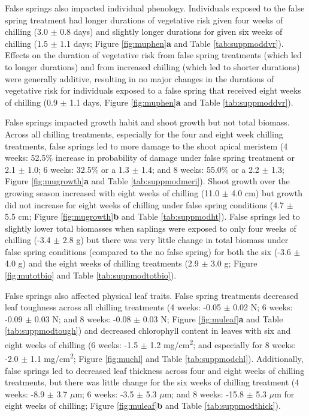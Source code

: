 \documentclass{article}\usepackage[]{graphicx}\usepackage[]{color}
\begin{document}
False springs also impacted individual phenology. Individuals exposed to the false spring treatment had longer durations of vegetative risk given four weeks of chilling (3.0 $\pm$ 0.8 days) and slightly longer durations for given six weeks of chilling (1.5 $\pm$ 1.1 days; Figure \ref{fig:muphen}\textbf{a} and Table \ref{tab:suppmoddvr}). Effects on the duration of vegetative risk from false spring treatments (which led to longer durations) and from increased chilling (which led to shorter durations) were generally additive, resulting in no major changes in the durations of vegetative risk for individuals exposed to a false spring that received eight weeks of chilling (0.9 $\pm$ 1.1 days, Figure \ref{fig:muphen}\textbf{a} and Table \ref{tab:suppmoddvr}). 

False springs impacted growth habit and shoot growth but not total biomass. Across all chilling treatments, especially for the four and eight week chilling treatments, false springs led to more damage to the shoot apical meristem (4 weeks: 52.5\% increase in probability of damage under false spring treatment or 2.1 $\pm$ 1.0; 6 weeks: 32.5\% or a 1.3 $\pm$ 1.4; and 8 weeks: 55.0\% or a 2.2 $\pm$ 1.3; Figure \ref{fig:mugrowth}\textbf{a} and Table \ref{tab:suppmodmeri}). Shoot growth over the growing season increased with eight weeks of chilling (11.0 $\pm$ 4.0 cm) but growth did not increase for eight weeks of chilling under false spring conditions (4.7 $\pm$ 5.5 cm; Figure \ref{fig:mugrowth}\textbf{b} and Table \ref{tab:suppmodht}). False springs led to slightly lower total biomasses when saplings were exposed to only four weeks of chilling (-3.4 $\pm$ 2.8 g) but there was very little change in total biomass under false spring conditions (compared to the no false spring) for both the six (-3.6 $\pm$ 4.0 g) and the eight weeks of chilling treatments (2.9 $\pm$ 3.0 g; Figure \ref{fig:mutotbio} and Table \ref{tab:suppmodtotbio}).
  
False springs also affected physical leaf traits. False spring treatments decreased leaf toughness across all chilling treatments (4 weeks: -0.05 $\pm$ 0.02 N; 6 weeks: -0.09 $\pm$ 0.03 N; and 8 weeks: -0.08 $\pm$ 0.03 N; Figure \ref{fig:muleaf}\textbf{a} and Table \ref{tab:suppmodtough}) and decreased chlorophyll content in leaves with six and eight weeks of chilling (6 weeks: -1.5 $\pm$ 1.2 mg/cm\textsuperscript{2}; and especially for 8 weeks: -2.0 $\pm$ 1.1 mg/cm\textsuperscript{2}; Figure \ref{fig:muchl} and Table \ref{tab:suppmodchl}). Additionally, false springs led to decreased leaf thickness across four and eight weeks of chilling treatments, but there was little change for the six weeks of chilling treatment (4 weeks: -8.9 $\pm$ 3.7 $\mu$m; 6 weeks: -3.5 $\pm$ 5.3 $\mu$m; and 8 weeks: -15.8 $\pm$ 5.3 $\mu$m for eight weeks of chilling; Figure \ref{fig:muleaf}\textbf{b} and Table \ref{tab:suppmodthick}). 
  
\end{document}
